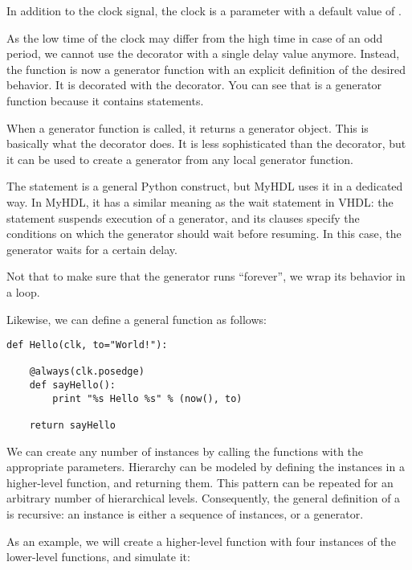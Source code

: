 In addition to the clock signal, the clock
 is a parameter with a default value of .

As the low time of the clock may differ from the high time in case of
an odd period, we cannot use the  decorator with a
single delay value anymore. Instead, the  function
is now a generator function with an explicit definition of the desired
behavior. It is decorated with the  decorator.
You can see that  is a generator function
because it contains  statements.

When a generator function is called, it returns a generator object.
This is basically what the  decorator does. It
is less sophisticated than the  decorator,
but it can be used to create a generator from any local generator
function.

The  statement is a general Python construct, but MyHDL
uses it in a dedicated way.  In MyHDL, it has a similar meaning as the
wait statement in VHDL: the statement suspends execution of a
generator, and its clauses specify the conditions on which the
generator should wait before resuming. In this case, the generator
waits for a certain delay.

Not that to make sure that the generator runs ``forever'', we wrap its
behavior in a  loop.

Likewise, we can define a general  function as follows:

\begin{verbatim}
def Hello(clk, to="World!"):

    @always(clk.posedge)
    def sayHello():
        print "%s Hello %s" % (now(), to)

    return sayHello
\end{verbatim}


We can create any number of instances by calling the functions with
the appropriate parameters. Hierarchy can be modeled by defining the
instances in a higher-level function, and returning them.
This pattern can be repeated for an arbitrary number of
hierarchical levels. Consequently, the general definition
of a \myhdl\  is recursive: an instance
is either a sequence of instances, or a generator.

As an example, we will create a higher-level function with
four instances of the lower-level functions, and simulate it:

